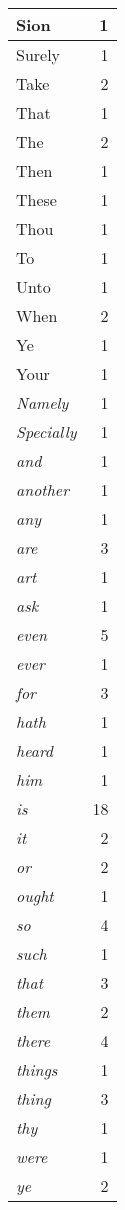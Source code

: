 \begin{center}
\begin{longtable}{l|r}
Sion & 1 \\ \hline
Surely & 1 \\ \hline
Take & 2 \\ \hline
That & 1 \\ \hline
The & 2 \\ \hline
Then & 1 \\ \hline
These & 1 \\ \hline
Thou & 1 \\ \hline
To & 1 \\ \hline
Unto & 1 \\ \hline
When & 2 \\ \hline
Ye & 1 \\ \hline
Your & 1 \\ \hline
\emph{Namely} & 1 \\ \hline
\emph{Specially} & 1 \\ \hline
\emph{and} & 1 \\ \hline
\emph{another} & 1 \\ \hline
\emph{any} & 1 \\ \hline
\emph{are} & 3 \\ \hline
\emph{art} & 1 \\ \hline
\emph{ask} & 1 \\ \hline
\emph{even} & 5 \\ \hline
\emph{ever} & 1 \\ \hline
\emph{for} & 3 \\ \hline
\emph{hath} & 1 \\ \hline
\emph{heard} & 1 \\ \hline
\emph{him} & 1 \\ \hline
\emph{is} & 18 \\ \hline
\emph{it} & 2 \\ \hline
\emph{or} & 2 \\ \hline
\emph{ought} & 1 \\ \hline
\emph{so} & 4 \\ \hline
\emph{such} & 1 \\ \hline
\emph{that} & 3 \\ \hline
\emph{them} & 2 \\ \hline
\emph{there} & 4 \\ \hline
\emph{things} & 1 \\ \hline
\emph{thing} & 3 \\ \hline
\emph{thy} & 1 \\ \hline
\emph{were} & 1 \\ \hline
\emph{ye} & 2 \\ \hline

\end{longtable}
\end{center}
